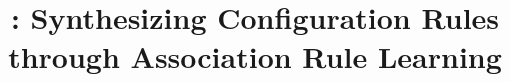 \documentclass{llncs}
\begin{document}
\setlength{\pdfpageheight}{\paperheight}
\setlength{\pdfpagewidth}{\paperwidth}





\title{\app: Synthesizing Configuration Rules through Association Rule Learning}

\author{\xspace}
\institute{\xspace}

\maketitle
\vspace{-45pt}




 









\end{document}
